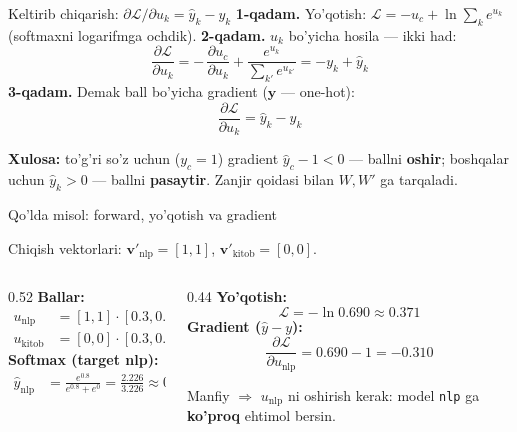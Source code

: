 \documentclass[aspectratio=169,11pt]{beamer}
\begin{document}
\begin{frame}{Keltirib chiqarish: $\partial\mathcal{L}/\partial u_k = \hat{y}_k - y_k$}
  \textbf{1-qadam.} Yo'qotish: $\mathcal{L} = -u_c + \ln\sum_{k} e^{u_k}$
  (softmaxni logarifmga ochdik).
  \pause
  \textbf{2-qadam.} $u_k$ bo'yicha hosila --- ikki had:
  $$ \frac{\partial \mathcal{L}}{\partial u_k}
     = -\,\frac{\partial u_c}{\partial u_k}
       + \frac{e^{u_k}}{\sum_{k'} e^{u_{k'}}} = -y_k + \hat{y}_k $$
  \pause
  \textbf{3-qadam.} Demak ball bo'yicha gradient ($\mathbf{y}$ --- one-hot):
  $$ \frac{\partial \mathcal{L}}{\partial u_k} = \hat{y}_k - y_k $$
  \begin{tcolorbox}[okbox,top=2pt,bottom=2pt]
    \small \textbf{Xulosa:} to'g'ri so'z uchun ($y_c{=}1$) gradient
    $\hat{y}_c-1<0$ --- ballni \textbf{oshir}; boshqalar uchun $\hat{y}_k>0$ ---
    ballni \textbf{pasaytir}. Zanjir qoidasi bilan $W,W'$ ga tarqaladi.
  \end{tcolorbox}
\end{frame}

\begin{frame}{Qo'lda misol: forward, yo'qotish va gradient}
  \begin{tcolorbox}[defbox,title={h=[0.3,0.5]; nomzodlar nlp (target), kitob}]
    \scriptsize
    Chiqish vektorlari: $\mathbf{v}'_{\text{nlp}}=[1,1]$, \;
    $\mathbf{v}'_{\text{kitob}}=[0,0]$.
  \end{tcolorbox}
  \vspace{0.2em}
  \begin{columns}[T]
    \begin{column}{0.52\textwidth}
      \small\textbf{Ballar:}
      \begin{align*}
        u_{\text{nlp}} &= [1,1]\cdot[0.3,0.5] = 0.8\\
        u_{\text{kitob}} &= [0,0]\cdot[0.3,0.5] = 0
      \end{align*}
      \textbf{Softmax (target nlp):}
      \begin{align*}
        \hat{y}_{\text{nlp}} &= \frac{e^{0.8}}{e^{0.8}+e^{0}}
          = \frac{2.226}{3.226} \approx \mathbf{0.690}
      \end{align*}
    \end{column}
    \begin{column}{0.44\textwidth}
      \small\textbf{Yo'qotish:}
      $$ \mathcal{L} = -\ln 0.690 \approx \mathbf{0.371} $$
      \textbf{Gradient ($\hat{y}-y$):}
      $$ \frac{\partial\mathcal{L}}{\partial u_{\text{nlp}}} = 0.690-1 = -0.310 $$
      \begin{tcolorbox}[okbox,top=2pt,bottom=2pt]
        \footnotesize
        Manfiy $\Rightarrow$ $u_{\text{nlp}}$ ni oshirish kerak: model
        \texttt{nlp} ga \textbf{ko'proq} ehtimol bersin.
      \end{tcolorbox}
    \end{column}
  \end{columns}
\end{frame}
\end{document}
